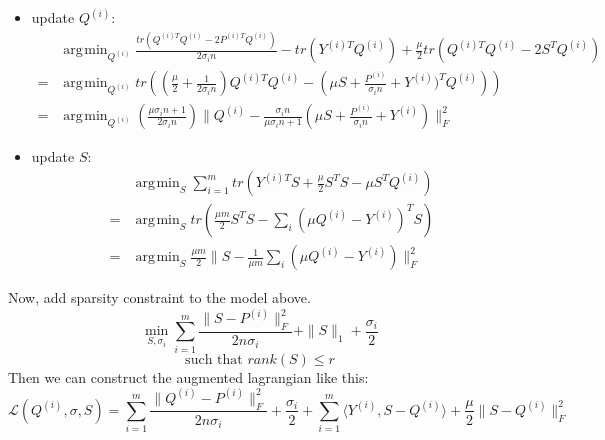 \documentclass[11pt]{article}
\DeclareMathOperator*{\argmin}{\arg\!\min}
\begin{document}
\begin{itemize}
\item
update $Q^{(i)}$:
\begin{align*}
&\argmin_{Q^{(i)}} \frac{tr(Q^{(i)T}Q^{(i)} - 2P^{(i)T}Q^{(i)})}{2\sigma_i n} - tr(Y^{(i)T}Q^{(i)}) + \frac{\mu}{2} tr(Q^{(i)T}Q^{(i)} - 2S^TQ^{(i)})\\
=&\argmin_{Q^{(i)}} tr \left(
\left( \frac{\mu}{2} + \frac{1}{2\sigma_i n}\right)
Q^{(i)T} Q^{(i)} - \left(  \mu S + \frac{P^{(i)}}{\sigma_i n} + Y^{(i)})^T Q^{(i)}
\right) \right)\\
=& \argmin_{Q^{(i)}} \left( \frac{\mu \sigma_i n + 1}{2\sigma_i n} \right)
\|Q^{(i)} - \frac{\sigma_i n} {\mu \sigma_i n + 1} \left(\mu S + \frac{P^{(i)}}{\sigma_i n} + Y^{(i)} \right)\|_F^2
\end{align*}

\item
update $S$:
\begin{align*}
&\argmin_S \sum_{i=1}^{m} tr \left(
Y^{(i)T}S + \frac{\mu}{2} S^TS - \mu S^T Q^{(i)}
\right)\\
= &\argmin_S tr \left(
\frac{\mu m}{2} S^TS - \sum_i (\mu Q^{(i)} - Y^{(i)})^T S
\right)\\
= &\argmin_S \frac{\mu m} {2} \| S - \frac{1}{\mu m} \sum_i (\mu Q^{(i)} - Y^{(i)}) \|_F^2 
\end{align*}
\end{itemize}


\noindent Now, add sparsity constraint to the model above.
$$\min_{S,\sigma_i} \sum_{i=1}^{m} \frac{\|S-P^{(i)}\|_F^2}{2n\sigma_i} + \|S\|_1+ \frac{\sigma_i}{2}$$
$$\text{such that }rank(S) \leq r$$
Then we can construct the augmented lagrangian like this:
$$
\mathcal{L}(Q^{(i)}, \sigma, S) = \sum_{i=1}^{m} \frac{\|Q^{(i)} - P^{(i)}\|_F^2}{2n\sigma_i} + \frac{\sigma_i}{2} + \sum_{i=1}^{m} \langle Y^{(i)}, S-Q^{(i)} \rangle + \frac{\mu}{2} \|S - Q^{(i)}\|^2_F
$$


\pagebreak
\end{document}
